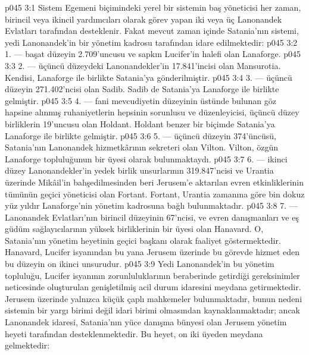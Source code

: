 \vs p045 3:1 Sistem Egemeni biçimindeki yerel bir sistemin baş yöneticisi her zaman, birincil veya ikincil yardımcıları olarak görev yapan iki veya üç Lanonandek Evlatları tarafından desteklenir. Fakat mevcut zaman içinde Satania’nın sistemi, yedi Lanonandek’in bir yönetim kadrosu tarafından idare edilmektedir:
\vs p045 3:2 1.\bibnobreakspace {} --- başat düzeyin 2.709’uncusu ve sapkın Lucifer’in halefi olan Lanaforge.
\vs p045 3:3 2.\bibnobreakspace {} --- üçüncü düzeydeki Lanonandekler’in 17.841’incisi olan Mansurotia. Kendisi, Lanaforge ile birlikte Satania’ya gönderilmiştir.
\vs p045 3:4 3.\bibnobreakspace {} --- üçüncü düzeyin 271.402’ncisi olan Sadib. Sadib de Satania’ya Lanaforge ile birlikte gelmiştir.
\vs p045 3:5 4.\bibnobreakspace {} --- fani mevcudiyetin düzeyinin üstünde bulunan göz hapsine alınmış ruhaniyetlerin hepsinin sorunlusu ve düzenleyicisi, üçüncü düzey birliklerin 19’uncusu olan Holdant. Holdant benzer bir biçimde Satania’ya Lanaforge ile birlikte gelmiştir.
\vs p045 3:6 5. --- üçüncü düzeyin 374’üncüsü, Satania’nın Lanonandek hizmetkârının sekreteri olan Vilton. Vilton, özgün Lanaforge topluluğunun bir üyesi olarak bulunmaktaydı.
\vs p045 3:7 6.\bibnobreakspace {} --- ikinci düzey Lanonandekler’in yedek birlik unsurlarının 319.847’ncisi ve Urantia üzerinde Mikâil’in bahşedilmesinden beri Jerusem’e aktarılan evren etkinliklerinin tümünün geçici yöneticisi olan Fortant. Fortant, Urantia zamanına göre bin dokuz yüz yıldır Lanaforge’nin yönetim kadrosuna bağlı bulunmaktadır.
\vs p045 3:8 7.\bibnobreakspace {} --- Lanonandek Evlatları’nın birincil düzeyinin 67’ncisi, ve evren danışmanları ve eş güdüm sağlayıcılarının yüksek birliklerinin bir üyesi olan Hanavard. O, Satania’nın yönetim heyetinin geçici başkanı olarak faaliyet göstermektedir. Hanavard, Lucifer isyanından bu yana Jerusem üzerinde bu görevde hizmet eden bu düzeyin on ikinci unsurudur.
\vs p045 3:9 Yedi Lanonandek’in bu yönetim topluluğu, Lucifer isyanının zorunluluklarının beraberinde getirdiği gereksinimler neticesinde oluşturulan genişletilmiş acil durum idaresini meydana getirmektedir. Jerusem üzerinde yalnızca küçük çaplı mahkemeler bulunmaktadır, bunun nedeni sistemin bir yargı birimi değil idari birimi olmasından kaynaklanmaktadır; ancak Lanonandek idaresi, Satania’nın yüce danışma bünyesi olan Jerusem yönetim heyeti tarafından desteklenmektedir. Bu heyet, on iki üyeden meydana gelmektedir:
